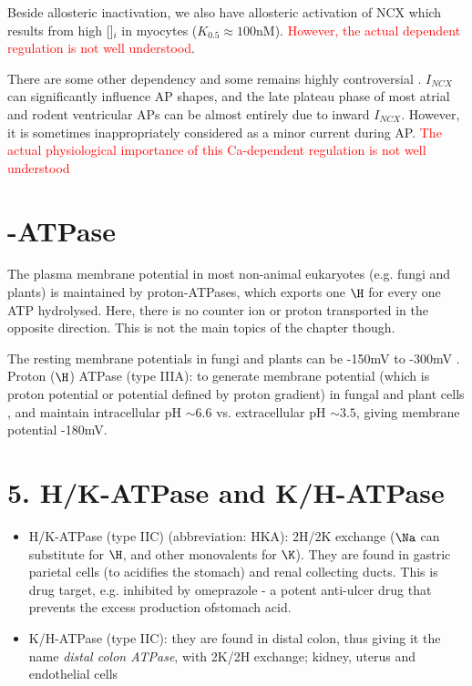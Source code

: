 Beside allosteric inactivation, we also have allosteric activation of
NCX which results from high []$_i$ in myocytes ($K_{0.5}
\approx 100$nM).
\textcolor{red}{However, the actual  dependent regulation is
  not well understood}.

There are some other dependency and some remains highly controversial
\citep{bers2008cca}.  $I_{NCX}$ can significantly influence AP shapes,
and the late plateau phase of most atrial and rodent ventricular APs
can be almost entirely due to inward $I_{NCX}$. However, it is
sometimes inappropriately considered as a minor current during AP.
\textcolor{red}{The actual physiological importance of this
  Ca-dependent regulation is not well understood}


\section{\texorpdfstring{-ATPase}{4. Proton-ATPase}}
\label{sec:H-ATPase}

The plasma membrane potential in most non-animal eukaryotes (e.g. fungi and
plants) is maintained by proton-ATPases, which exports one $\H$ for every one
ATP hydrolysed. Here, there is no counter ion or proton transported in the
opposite direction. This is not the main topics of the chapter though. 

The resting membrane potentials in fungi and plants can be -150mV to -300mV
\citep{morth2011}.
Proton ($\H$) ATPase (type IIIA): to generate membrane potential (which
  is proton potential or potential defined by proton gradient) in fungal and
  plant cells \citep{slayman1970}, and maintain intracellular pH $\sim 6.6$ vs.
  extracellular pH $\sim 3.5$, giving membrane potential -180mV.
  
\section{5. H/K-ATPase and K/H-ATPase}
\label{sec:H/K-ATPase}
\label{sec:K/H-ATPase}

\begin{itemize}
  \item H/K-ATPase (type IIC) (abbreviation: HKA): 2H/2K exchange ($\Na$ can
  substitute for $\H$, and other monovalents for $\K$). They are found in gastric parietal cells (to
  acidifies the stomach) and renal collecting ducts. This is drug target, e.g.
  inhibited by omeprazole - a potent anti-ulcer drug that prevents the
  excess production ofstomach acid.
  
  \item K/H-ATPase (type IIC): they are found in distal colon, thus giving it
  the name {\it distal colon ATPase}, with 2K/2H exchange; kidney, uterus and
  endothelial cells
\end{itemize}

